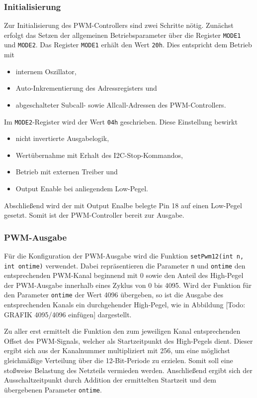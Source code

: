 \documentclass[a4paper,12pt]{scrartcl}
\begin{document}
\subsubsection{Initialisierung}
Zur Initialisierung des PWM-Controllers sind zwei Schritte nötig. Zunächst erfolgt das Setzen der allgemeinen Betriebsparameter über die Register \texttt{MODE1} und \texttt{MODE2}. Das Register \texttt{MODE1} erhält den Wert \texttt{20h}. Dies entspricht dem Betrieb mit 
\begin{itemize}
\item internem Oszillator,
\item Auto-Inkrementierung des Adressregisters und
\item abgeschalteter Subcall- sowie Allcall-Adressen des PWM-Controllers.
\end{itemize}
Im \texttt{MODE2}-Register wird der Wert \texttt{04h} geschrieben. Diese Einstellung bewirkt
\begin{itemize}
\item nicht invertierte Ausgabelogik,
\item Wertübernahme mit Erhalt des I2C-Stop-Kommandos,
\item Betrieb mit externen Treiber und
\item Output Enable bei anliegendem Low-Pegel.
\end{itemize}
Abschließend wird der mit Output Enalbe belegte Pin 18 auf einen Low-Pegel gesetzt. Somit ist der PWM-Controller bereit zur Ausgabe.

\subsubsection{PWM-Ausgabe}
\label{sec:pwmOut}
Für die Konfiguration der PWM-Ausgabe wird die Funktion \texttt{setPwm12(int n, int ontime)} verwendet. Dabei repräsentieren die Parameter \texttt{n} und \texttt{ontime} den entsprechenden PWM-Kanal beginnend mit 0 sowie den Anteil des High-Pegel der PWM-Ausgabe innerhalb eines Zyklus von 0 bis 4095. Wird der Funktion für den Parameter \texttt{ontime} der Wert 4096 übergeben, so ist die Ausgabe des entsprechenden Kanals ein durchgehender High-Pegel, wie in Abbildung [Todo: GRAFIK 4095/4096 einfügen] dargestellt.

Zu aller erst ermittelt die Funktion den zum jeweiligen Kanal entsprechenden Offset des PWM-Signals, welcher als Startzeitpunkt des High-Pegels dient. Dieser ergibt sich aus der Kanalnummer multipliziert mit 256, um eine möglichst gleichmäßige Verteilung über die 12-Bit-Periode zu erzielen. Somit soll eine stoßweise Belastung des Netzteils vermieden werden. Anschließend ergibt sich der Ausschaltzeitpunkt durch Addition der ermittelten Startzeit und dem übergebenen Parameter \texttt{ontime}.
\end{document}
